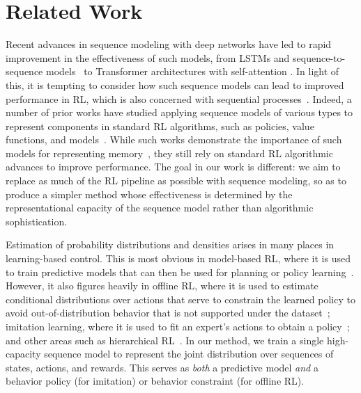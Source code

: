 \section{Related Work}
\label{sec:related}

Recent advances in sequence modeling with deep networks have led to rapid improvement in the effectiveness of such models, from LSTMs and sequence-to-sequence models~\citep{hochreiter1997long, NIPS2014_a14ac55a} to Transformer architectures with self-attention \citep{vaswani2017attention}.
In light of this, it is tempting to consider how such sequence models can lead to improved performance in RL, which is also concerned with sequential processes~\citep{sutton1988learning}. Indeed, a number of prior works have studied applying sequence models of various types to represent components in standard RL algorithms, such as policies, value functions, and models~\citep{bakker2002reinforcement, Heess2015MemorybasedCW, chiappa2017recurrent,parisotto2020stabilizing,parisotto2021efficient,kumar2020adaptive}. While such works demonstrate the importance of such models for representing memory~\citep{oh2016control}, they still rely on standard RL algorithmic advances to improve performance. The goal in our work is different: we aim to replace as much of the RL pipeline as possible with sequence modeling, so as to produce a simpler method whose effectiveness is determined by the representational capacity of the sequence model rather than algorithmic sophistication.

Estimation of probability distributions and densities arises in many places in learning-based control. This is most obvious in model-based RL, where it is used to train predictive models that can then be used for planning or policy learning~\citep{sutton1990dyna,silver2008dyna2,fairbank2008reinforcement,deisenroth2011pilco,lampe2014modelnfq,heess2015svg,janner2020gamma,amos2020model}. However, it also figures heavily in offline RL, where it is used to estimate conditional distributions over actions that serve to constrain the learned policy to avoid out-of-distribution behavior that is not supported under the dataset~\citep{fujimoto2019off,kumar2019stabilizing,ghasemipour2020emaq}; imitation learning, where it is used to fit an expert's actions to obtain a policy~\citep{ross2010efficient,ross2011reduction}; and other areas such as hierarchical RL~\citep{peng2017deeploco,co2018self,jiang2019language}.
In our method, we train a single high-capacity sequence model to represent the joint distribution over sequences of states, actions, and rewards.
This serves as \emph{both} a predictive model \emph{and} a behavior policy (for imitation) or behavior constraint (for offline RL).

